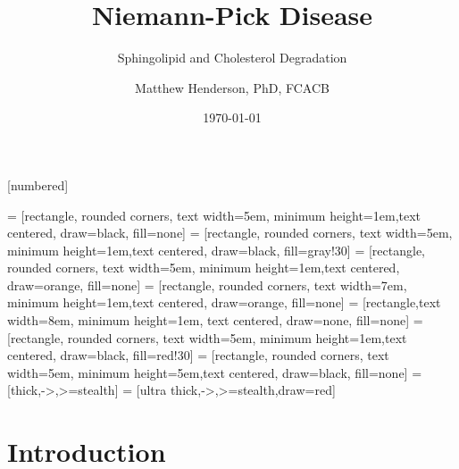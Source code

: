 \documentclass[presentation, smaller]{beamer}
\author{Matthew Henderson, PhD, FCACB}
\date{\today}
\title{Niemann-Pick Disease}
\subtitle{Sphingolipid and Cholesterol Degradation}
\institute[NSO]{Newborn Screening Ontario | The University of Ottawa}
\begin{document}
\maketitle

\vspace{220pt}
\beamertemplatenavigationsymbolsempty
{}[numbered]

 = [rectangle, rounded corners, text width=5em, minimum height=1em,text centered, draw=black, fill=none]
 = [rectangle, rounded corners, text width=5em, minimum height=1em,text centered, draw=black, fill=gray!30]
 = [rectangle, rounded corners, text width=5em, minimum height=1em,text centered, draw=orange, fill=none]
 = [rectangle, rounded corners, text width=7em, minimum height=1em,text centered, draw=orange, fill=none]
 = [rectangle,text width=8em, minimum height=1em, text centered, draw=none, fill=none]
 = [rectangle, rounded corners, text width=5em, minimum height=1em,text centered, draw=black, fill=red!30]
 = [rectangle, rounded corners, text width=5em, minimum height=5em,text centered, draw=black, fill=none]
 = [thick,->,>=stealth]
 = [ultra thick,->,>=stealth,draw=red]

\section{Introduction}
\label{sec:orgheadline10}
\end{document}
